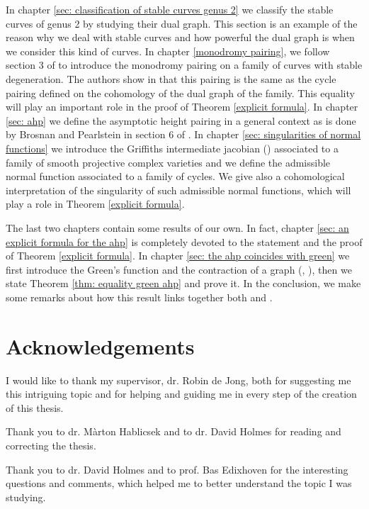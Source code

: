 \documentclass[a4paper,12 pt,titlepage,twoside]{book}
\theoremstyle{plain}
\theoremstyle{theorem}
\theoremstyle{definition}
\theoremstyle{remark}
\begin{document}
	In chapter \ref{sec: classification of stable curves genus 2} we classify the stable curves of genus 2 by studying their dual graph. This section is an example of the reason why we deal with stable curves and how powerful the dual graph is when we consider this kind of curves. In chapter \ref{monodromy pairing}, we follow section 3 of \cite{MR3588803} to introduce the monodromy pairing on a family of curves with stable degeneration. The authors show in \cite{MR3588803} that this pairing is the same as the cycle pairing defined on the cohomology of the dual graph of the family. This equality will play an important role in the proof of Theorem \ref{explicit formula}. In chapter \ref{sec: ahp} we define the asymptotic height pairing in a general context as is done by Brosnan and Pearlstein in section 6 of \cite{MR3983292}. In chapter \ref{sec: singularities of normal functions} we introduce the Griffiths intermediate jacobian (\cite{MR3184171}) associated to a family of smooth projective complex varieties and we define the admissible normal function associated to a family of cycles. We give also a cohomological interpretation of the singularity of such admissible normal functions, which will play a role in Theorem \ref{explicit formula}.
	
	The last two chapters contain some results of our own. In fact, chapter \ref{sec: an explicit formula for the ahp} is completely devoted to the statement and the proof of Theorem \ref{explicit formula}. In chapter \ref{sec: the ahp coincides with green} we first introduce the Green's function and the contraction of a graph (\cite{MR3488379}, \cite{MR2794031}), then we state Theorem \ref{thm: equality green ahp} and prove it. In the conclusion, we make some remarks about how this result links together both \cite{MR3983292} and \cite{MR3488379}.
	\newpage
\chapter*{Acknowledgements}
I would like to thank my supervisor, dr. Robin de Jong, both for suggesting me this intriguing topic and for helping and guiding me in every step of the creation of this thesis.

Thank you to dr. M{à}rton Hablicsek and to dr. David Holmes for reading and correcting the thesis. 

Thank you to dr. David Holmes and to prof. Bas Edixhoven for the interesting questions and comments, which helped me to better understand the topic I was studying.
\end{document}

